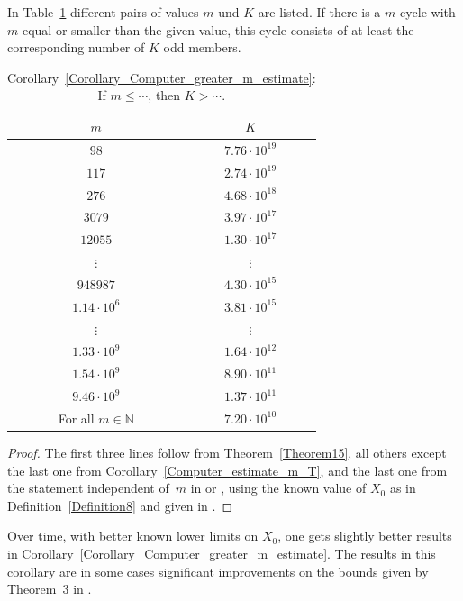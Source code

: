 \documentclass[12pt,reqno]{article}
\begin{document}
\begin{corollary}\label{Corollary_Computer_greater_m_estimate}
In Table~\ref{Collatz_Table_One} different pairs of values $m$ und $K$ are listed. If there is a $m$-cycle with $m$ equal or smaller than the given value, this cycle consists of at least the corresponding number of $K$ odd members.

\begin{table}[htb]
\begin{center}
\begin{tabular}{c|c}
$m$ & $K$\\
\hline
$98$ & $7.76\cdot 10^{19}$ \\
$117$ & $2.74\cdot 10^{19}$\\
$276$ & $4.68\cdot 10^{18}$\\
$3079$ & $3.97\cdot 10^{17}$\\
$12055$ & $1.30\cdot 10^{17}$\\
$\vdots$ & $\vdots$\\
$948987$ & $4.30\cdot 10^{15}$\\
$1.14\cdot 10^6$ & $3.81\cdot 10^{15}$\\
$\vdots$ & $\vdots$\\
$1.33\cdot 10^9$ & $1.64\cdot 10^{12}$\\
$1.54\cdot 10^9$ & $8.90\cdot 10^{11}$\\
$9.46\cdot 10^9$ & $1.37\cdot 10^{11}$\\
For all $m\in\mathbb{N}$ & $7.20\cdot 10^{10}$
\end{tabular}
\caption{Corollary~\ref{Corollary_Computer_greater_m_estimate}: If $m\leq \cdots$, then $K>\cdots$.}
\label{Collatz_Table_One}
\end{center}
\end{table}
\end{corollary}

\begin{proof}
The first three lines follow from Theorem~\ref{Theorem15}, all others except the last one from Corollary~\ref{Computer_estimate_m_T}, and the last one from the statement independent of~$m$ in \cite{He,Pu} or \cite{SE}, using the known value of $X_0$ as in Definition~\ref{Definition8} and given in \cite{Barina-www}.
\end{proof}

\begin{remark}
Over time, with better known lower limits on $X_0$, one gets slightly better results in Corollary~\ref{Corollary_Computer_greater_m_estimate}. The results in this corollary are in some cases significant improvements on the bounds given by  Theorem~3 in \cite{SW-www}.
\end{remark}
\end{document}
